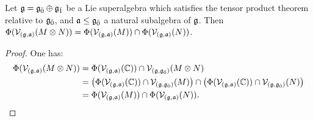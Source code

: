 \begin{proposition}
  Let $\g = \even{\g} \oplus \odd{\g}$ be a Lie superalgebra which satisfies the tensor product theorem relative to $\even{\g}$, and $\a \leq \even{\g}$ a natural subalgebra of $\g$.  Then $\Phi(\V_{(\g,\a)}(M \otimes N)) = \Phi(\V_{(\g,\a)}(M)) \cap \Phi(\V_{(\g,\a)}(N))$.
\end{proposition}
\begin{proof}
  One has:
  \begin{align*}
    \Phi(\V_{(\g,\a)}(M \otimes N)) &= \Phi(\V_{(\g,\a)}(\CC)) \cap \V_{(\g,\even{\g})}(M \otimes N) \\
                                   &= \left(\Phi(\V_{(\g,\a)}(\CC)) \cap \V_{(\g,\even{\g})}(M)\right) \cap \left( \Phi(\V_{(\g,\a)}(\CC)) \cap \V_{(\g,\even{\g})}(N)\right) \\
    &= \Phi(\V_{(\g,\a)}(M)) \cap \Phi(\V_{(\g,\a)}(N)).
  \end{align*}
\end{proof}

